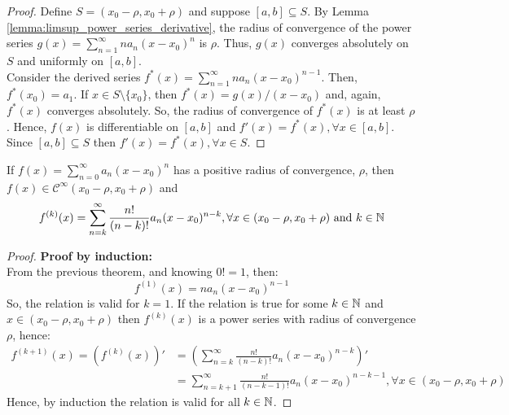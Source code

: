 \begin{proof}
    Define $S = (x_0 - \rho, x_0 + \rho)$ and suppose $[a,b] \subseteq S$. By Lemma \ref{lemma:limsup_power_series_derivative}, the radius of convergence of the power series $g(x) = \sum_{n=1}^\infty n a_n (x - x_0)^n$ is $\rho$. Thus, $g(x)$ converges absolutely on $S$ and uniformly on $[a,b]$.\\
    Consider the derived series $f^{*}(x) = \sum_{n=1}^\infty n a_n (x - x_0)^{n-1}$. Then, $f^{*}(x_0) = a_1$. If $x \in S \setminus \{x_0\}$, then $f^{*}(x) = g(x)/(x - x_0)$ and, again, $f^{*}(x)$ converges absolutely. So, the radius of convergence of $f^{*}(x)$ is at least $\rho$. Hence, $f(x)$ is differentiable on $[a,b]$ and $f'(x) = f^{*}(x), \forall x \in [a,b]$. Since $[a,b] \subseteq S$ then $f'(x) = f^{*}(x), \forall x \in S$.
\end{proof}

\begin{corollary}
    If $f(x) = \sum_{n=0}^\infty a_n (x-x_0)^n$ has a positive radius of convergence, $\rho$, then $f(x) \in \mathcal{C}^\infty(x_0 - \rho, x_0 + \rho)$ and
    \begin{equation*}
        f^{(k)}(x) = \sum \limits_{n = k}^\infty \frac{n!}{(n-k)!}a_n (x - x_0)^{n-k}, \forall x \in (x_0 - \rho, x_0 + \rho) \text{ and } k \in \mathbb{N}
    \end{equation*}
\end{corollary}

\begin{proof}
    \textbf{Proof by induction:}\\
    From the previous theorem, and knowing $0! = 1$, then:
    \begin{equation*}
        f^{(1)}(x) = n a_n (x - x_0)^{n-1}
    \end{equation*}
    So, the relation is valid for $k = 1$. If the relation is true for some $k \in \mathbb{N}$ and $x \in (x_0 - \rho, x_0 + \rho)$ then $f^{(k)}(x)$ is a power series with radius of convergence $\rho$, hence:
    \begin{align*}
        f^{(k+1)}(x) = (f^{(k)}(x))' &= \left(
            \sum \limits_{n=k}^\infty \frac{n!}{(n-k)!}a_n (x-x_0)^{n-k}
        \right)' \\
        &= \sum \limits_{n = k + 1}^\infty \frac{n!}{(n-k-1)!}a_n (x - x_0)^{n-k-1}, \forall x \in (x_0 - \rho, x_0 + \rho)
    \end{align*}
    Hence, by induction the relation is valid for all $k \in \mathbb{N}$.
\end{proof}

